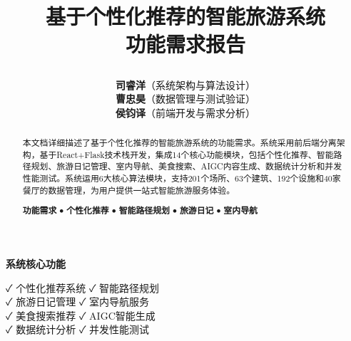 \documentclass[12pt,a4paper]{article}
\title{
    \vspace{-2cm}
    \begin{tcolorbox}[
        colback=primary,
        coltext=white,
        halign=center,
        rounded corners=10pt,
        drop shadow
    ]
    \huge\textbf{基于个性化推荐的智能旅游系统}\\[0.5cm]
    \Large\textbf{功能需求报告}
    \end{tcolorbox}
    \vspace{1cm}
}
\author{
    \begin{tcolorbox}[
        colback=light,
        colframe=secondary,
        halign=center,
        rounded corners=5pt,
        width=0.8\textwidth
    ]
    \large
    \textbf{司睿洋}（系统架构与算法设计）\\[0.3cm]
    \textbf{曹忠昊}（数据管理与测试验证）\\[0.3cm]
    \textbf{侯钧译}（前端开发与需求分析）
    \end{tcolorbox}
}
\date{
    \begin{tcolorbox}[
        colback=secondary!20,
        colframe=secondary,
        halign=center,
        rounded corners=5pt,
        width=0.5\textwidth
    ]
    \large\today
    \end{tcolorbox}
}
\begin{document}
\thispagestyle{empty}
\maketitle

\vfill

\begin{center}
\begin{tcolorbox}[
    colback=accent!20,
    colframe=accent,
    width=0.9\textwidth,
    rounded corners=8pt,
    halign=center
]
\textbf{\large 系统核心功能}\\[0.3cm]
\begin{minipage}{0.8\textwidth}
\centering
✓ 个性化推荐系统 \quad ✓ 智能路径规划\\[0.2cm]
✓ 旅游日记管理 \quad ✓ 室内导航服务\\[0.2cm]
✓ 美食搜索推荐 \quad ✓ AIGC智能生成\\[0.2cm]
✓ 数据统计分析 \quad ✓ 并发性能测试
\end{minipage}
\end{tcolorbox}
\end{center}

\newpage

\begin{abstract}
\begin{tcolorbox}[
    colback=light,
    colframe=primary,
    title={\Large\textbf{摘要}},
    coltitle=white,
    colbacktitle=primary,
    fonttitle=\bfseries,
    rounded corners=8pt,
    drop shadow
]
本文档详细描述了基于个性化推荐的智能旅游系统的功能需求。系统采用前后端分离架构，基于React+Flask技术栈开发，集成14个核心功能模块，包括个性化推荐、智能路径规划、旅游日记管理、室内导航、美食搜索、AIGC内容生成、数据统计分析和并发性能测试。系统运用6大核心算法模块，支持201个场所、63个建筑、192个设施和40家餐厅的数据管理，为用户提供一站式智能旅游服务体验。
\end{tcolorbox}

\vspace{0.5cm}

\begin{tcolorbox}[
    colback=secondary!10,
    colframe=secondary,
    title={\Large\textbf{关键词}},
    coltitle=white,
    colbacktitle=secondary,
    fonttitle=\bfseries,
    rounded corners=8pt,
    drop shadow
]
\centering
\textbf{功能需求} \quad $\bullet$ \quad \textbf{个性化推荐} \quad $\bullet$ \quad \textbf{智能路径规划} \quad $\bullet$ \quad \textbf{旅游日记} \quad $\bullet$ \quad \textbf{室内导航}
\end{tcolorbox}
\end{abstract}
\end{document}

